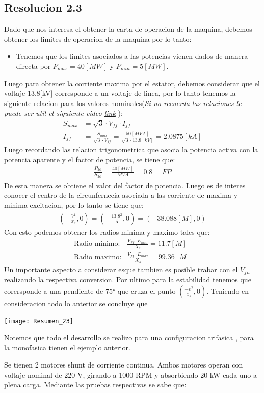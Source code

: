 \documentclass[
  11pt,
  letterpaper,
   addpoints,
   answers
  ]{exam}
\begin{document}
\begin{questions}
\begin{solution}
\subsection*{Resolucion 2.3}
Dado que nos interesa el obtener la carta de operacion de la maquina, debemos obtener los limites de operacion de la maquina por lo tanto:
\begin{itemize}
    \item Tenemos que los limites asociados a las potencias vienen dados de manera directa por $P_{max} = 40[MW]$ y $P_{min} = 5[MW]$.
\end{itemize}
Luego para obtener la corriente maxima por el estator, debemos considerar que el voltaje 13.8[kV] corresponde a un voltaje de linea, por lo tanto tenemos la siguiente relacion para los valores nominales(\textit{Si no recuerda las relaciones le puede ser util el siguiente video \href{https://www.youtube.com/watch?v=8dIj_e6PR-k}{link}
}):
\begin{align}
    S_{max} &= \sqrt{3} \cdot V_{ff} \cdot  I_{ff}\\
    I_{ff} &= \frac{S_{max}}{\sqrt{3} \cdot V_{ff}} = \frac{50[MVA]}{\sqrt{3} \cdot 13.8[kV]} = 2.0875[kA]
\end{align}
Luego recordando las relacion trigonometrica que asocia la potencia activa con la potencia aparente y el factor de potencia, se tiene que:
\begin{align}
    \frac{P_{3\phi}}{S_{3\phi}}= \frac{40 [MW]}{MVA} = 0.8 = FP
\end{align}
De esta manera se obtiene el valor del factor de potencia. Luego es de interes conocer el centro de la circunfernecia asociada a las corriente de maxima y minima excitacion, por lo tanto se tiene que:
\begin{align}
    \left( -\frac{V^2}{x_s}, 0 \right) = \left( -\frac{13.8^2}{5}, 0 \right) = (-38.088[M] , 0)
\end{align}
Con esto podemos obtener los radios minima y maximo tales que:
\begin{align}
    \text{Radio minimo:} & \frac{V_{ff} \cdot E_{min}}{X_{s}} = 11.7[M] \\
    \text{Radio maximo:} & \frac{V_{ff} \cdot E_{max}}{X_{s}} = 99.36[M]
\end{align}
Un importante aspecto a considerar esque tambien es posible trabar con el $V_{fn}$ realizando la respectiva conversion. Por ultimo para la estabilidad tenemos que corersponde a una pendiente de 75° que cruza el punto $\left( \frac{-v^{2}}{x_{s}},0\right)$. Teniendo en consideracion todo lo anterior se concluye que 
\begin{center}
    \texttt{[image: Resumen\_23]} \\
\end{center}
Notemos que todo el desarrollo se realizo para una configuracion trifasica , para la monofasica tienen el ejemplo anterior.
 \end{solution}
\question Se tienen 2 motores shunt de corriente continua. Ambos motores operan con voltaje nominal de 220 V, girando a 1000 RPM y absorbiendo 20 kW cada uno a plena carga. Mediante las pruebas respectivas se sabe que:


\end{questions}
\end{document}

